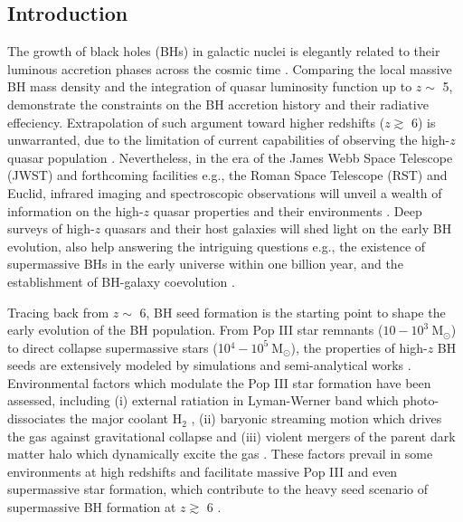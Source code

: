 \documentclass[twocolumn, twocolappendix]{aastex63}
\newcommand{\Msun}{\mathrm{M_\odot}}
\newcommand{\hh}{\mathrm{H_2}}
\begin{document}
\begin{CJK*}{UTF8}{gbsn}
\vspace{5mm}
\section{Introduction} \label{sec:intro}
The growth of black holes (BHs) in galactic nuclei is elegantly related to their luminous accretion phases 
across the cosmic time \citep{1982MNRAS.200..115S,1992MNRAS.259..725S}. 
Comparing the local massive BH mass density and the integration of quasar luminosity function up to $z\sim$ 5, 
\citet{2002MNRAS.335..965Y} demonstrate the constraints on the BH accretion history and their radiative effeciency.
Extrapolation of such argument toward higher redshifts ($z\gtrsim$ 6) is unwarranted, 
due to the limitation of current capabilities of observing the high-$z$ quasar population \citep{2019BAAS...51c.121F}. 
Nevertheless, 
in the era of the James Webb Space Telescope (JWST) and forthcoming facilities 
e.g., the Roman Space Telescope (RST) and Euclid, 
infrared imaging and spectroscopic observations will unveil a wealth of information on the
high-$z$ quasar properties and their environments 
\citep{2019BAAS...51c..45R, 2019arXiv190205569A, 2011arXiv1110.3193L}. 
Deep surveys of high-$z$ quasars and their host galaxies will shed light on the early BH evolution, 
also help answering the intriguing questions e.g., 
the existence of supermassive BHs in the early universe within one billion year, 
and the establishment of BH-galaxy coevolution \citep{2012Sci...337..544V,2013ASSL..396..293H,2020ARA&A..58...27I}.

Tracing back from $z\sim$ 6, BH seed formation is the starting point to shape the early evolution of the BH population.
From Pop III star remnants ($10-10^3 ~\Msun$) to direct collapse supermassive stars (10$^4-10^5 ~\Msun$), 
the properties of high-$z$ BH seeds are extensively modeled by simulations and semi-analytical works 
\citep[e.g.,][Toyouchi 2022]{2001ApJ...546..635O,2002Sci...295...93A,2006ApJ...652....6Y,2011MNRAS.416.2748I,
2012ApJ...756...93H,2013ApJ...778..178H,2014MNRAS.439.3798F,
2014MNRAS.445L.109I,2014MNRAS.445..544S,2014MNRAS.445..107V,2020MNRAS.499.5960S}. 
Environmental factors which modulate the Pop III star formation have been assessed, 
including (i) external ratiation in Lyman-Werner band which photo-dissociates the major coolant $\hh$ 
\citep{2002ApJ...569..558O,2003Natur.425..812B,2010MNRAS.402.1249S},
(ii) baryonic streaming motion which drives the gas against gravitational collapse 
\citep{2012MNRAS.424.1335F, 2014MNRAS.439.1092T, 2018ApJ...855...17H}
and 
(iii) violent mergers of the parent dark matter halo which dynamically excite the gas 
\citep{2003ApJ...592..645Y,2019Natur.566...85W}. 
These factors prevail in some environments at high redshifts and facilitate massive Pop III and even supermassive star formation, 
which contribute to the heavy seed scenario of supermassive BH formation at $z\gtrsim$ 6 
\citep[see a review by][]{2020ARA&A..58...27I}. 


\end{CJK*}
\end{document}
